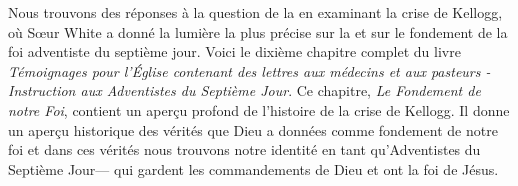 Nous trouvons des réponses à la question de la  en examinant la crise de Kellogg, où Sœur White a donné la lumière la plus précise sur la  et sur le fondement de la foi adventiste du septième jour. Voici le dixième chapitre complet du livre \textit{Témoignages pour l'Église contenant des lettres aux médecins et aux pasteurs - Instruction aux Adventistes du Septième Jour}. Ce chapitre, \textit{Le Fondement de notre Foi}, contient un aperçu profond de l'histoire de la crise de Kellogg. Il donne un aperçu historique des vérités que Dieu a données comme fondement de notre foi et dans ces vérités nous trouvons notre identité en tant qu'Adventistes du Septième Jour— qui gardent les commandements de Dieu et ont la foi de Jésus.
